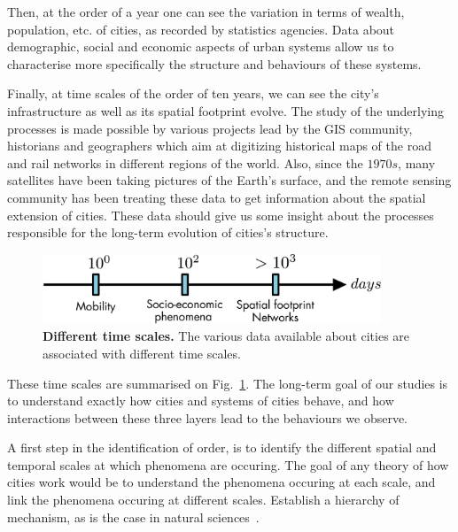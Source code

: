 Then, at the order of a year one can see the variation in terms of wealth,
population, etc. of cities, as recorded by statistics agencies. Data about
demographic, social and economic aspects of urban systems allow us to
characterise more specifically the structure and behaviours of these systems.

Finally, at time scales of the order of ten years, we can see the city's
infrastructure as well as its spatial footprint evolve. The study of the
underlying processes is made possible by various projects lead by the GIS
community, historians and geographers which aim at digitizing historical maps of
the road and rail networks in different regions of the world. Also, since the
$1970s$, many satellites have been taking pictures of the Earth's surface, and
the remote sensing community has been treating these data to get information
about the spatial extension of cities. These data should give us some insight
about the processes responsible for the long-term evolution of cities's
structure.\\

\begin{figure}[!h]
    \centering
    \includegraphics[width=0.9\textwidth]{./gfx/chapter-intro/time_scales.pdf}
    \caption{{\bf Different time scales.} The various data available about
    cities are associated with different time scales.\label{fig:timescale}}
\end{figure}

These time scales are summarised on Fig.~\ref{fig:timescale}. The long-term goal of our studies is to understand exactly how cities and systems of cities behave, and how interactions between these three layers lead to the behaviours we observe. 





A first step in the identification of order, is to identify the different
spatial and temporal scales at which phenomena are occuring. The goal of any
theory of how cities work would be to understand the phenomena occuring at each
scale, and link the phenomena occuring at different scales. Establish a
hierarchy of mechanism, as is the case in natural sciences~\cite{Simon:1962}.

